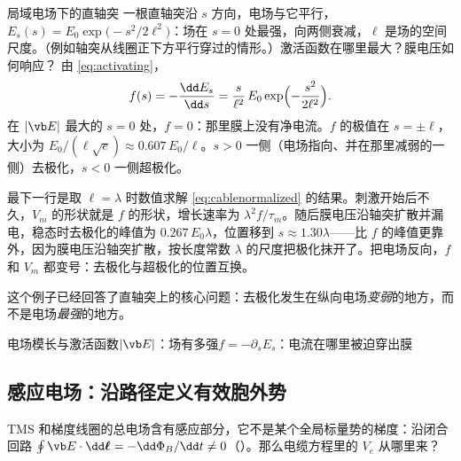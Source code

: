 \begin{example}[label=ex:neuro-gauss]{局域电场下的直轴突}
一根直轴突沿 $s$ 方向，电场与它平行，$E_s(s)=E_0\exp\bigl(-s^2/2\ell^2\bigr)$：场在 $s=0$ 处最强，向两侧衰减，$\ell$ 是场的空间尺度。（例如轴突从线圈正下方平行穿过的情形。）激活函数在哪里最大？膜电压如何响应？
\solution
由 \eqref{eq:activating}，
\begin{equation*}
f(s)=-\frac{\dd E_s}{\dd s}=\frac{s}{\ell^2}\,E_0\exp\Bigl(-\frac{s^2}{2\ell^2}\Bigr).
\end{equation*}
在 $|\vb E|$ 最大的 $s=0$ 处，$f=0$：那里膜上没有净电流。$f$ 的极值在 $s=\pm\ell$，大小为 $E_0/(\ell\sqrt e)\approx0.607\,E_0/\ell$。$s>0$ 一侧（电场指向、并在那里减弱的一侧）去极化，$s<0$ 一侧超极化。

 最下一行是取 $\ell=\lambda$ 时数值求解 \eqref{eq:cablenormalized} 的结果。刺激开始后不久，$V_m$ 的形状就是 $f$ 的形状，增长速率为 $\lambda^2f/\tau_m$。随后膜电压沿轴突扩散并漏电，稳态时去极化的峰值为 $0.267\,E_0\lambda$，位置移到 $s\approx1.30\lambda$——比 $f$ 的峰值更靠外，因为膜电压沿轴突扩散，按长度常数 $\lambda$ 的尺度把极化抹开了。把电场反向，$f$ 和 $V_m$ 都变号：去极化与超极化的位置互换。
\end{example}

这个例子已经回答了直轴突上的核心问题：去极化发生在纵向电场\emph{变弱}的地方，而不是电场\emph{最强}的地方。

\begin{compare}{电场模长与激活函数}{$|\vb E|$：场有多强}{$f=-\partial_sE_s$：电流在哪里被迫穿出膜}
\end{compare}

\subsection{感应电场：沿路径定义有效胞外势}
TMS 和梯度线圈的总电场含有感应部分，它不是某个全局标量势的梯度：沿闭合回路 $\oint\vb E\cdot\dd\boldsymbol\ell=-\dd\Phi_B/\dd t\ne0$（）。那么电缆方程里的 $V_e$ 从哪里来？

